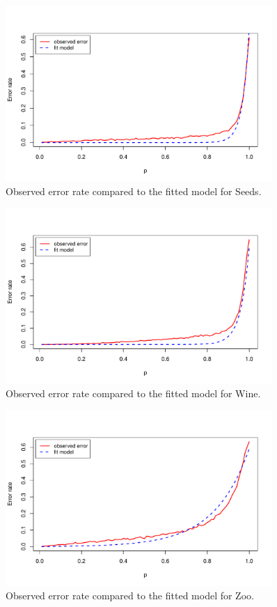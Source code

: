 \documentclass{article}
\begin{document}
\begin{figure}
 \centering
 \includegraphics[width=0.9\textwidth]{./figures/seeds.pdf}
 \caption{Observed error rate compared to the fitted model for Seeds.}
 \label{fig:seeds}
\end{figure}

\begin{figure}
 \centering
 \includegraphics[width=0.9\textwidth]{./figures/wine.pdf}
 \caption{Observed error rate compared to the fitted model for Wine.}
 \label{fig:wine}
\end{figure}

\begin{figure}
 \centering
 \includegraphics[width=0.9\textwidth]{./figures/zoo.pdf}
 \caption{Observed error rate compared to the fitted model for Zoo.}
 \label{fig:zoo}
\end{figure}
\end{document}

